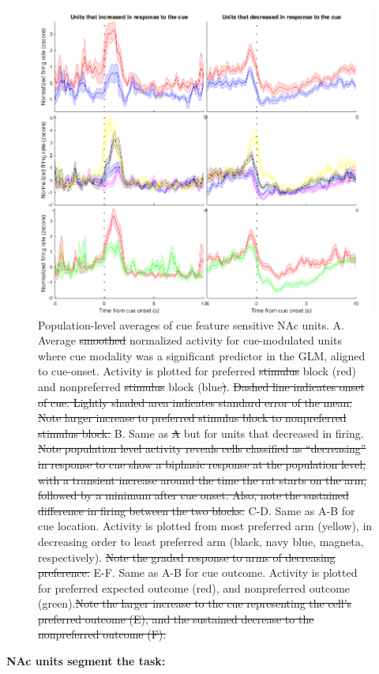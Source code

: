 \documentclass[11pt]{article}
\providecommand{\DIFdel}[1]{{\protect\color{red}\sout{#1}}}                      %
\providecommand{\DIFdelFL}[1]{\DIFdel{#1}} %
\providecommand{\DIFdelbeginFL}{} %
\providecommand{\DIFdelendFL}{} %
\newcommand{\DIFscaledelfig}{0.5}
\newlength{\DIFdelgraphicswidth} %
\newlength{\DIFdelgraphicsheight} %
\newcommand{\DIFdelincludegraphics}[2][]{%
\sbox{\DIFdelgraphicsbox}{\DIFOincludegraphics[#1]{#2}}%
\settoboxwidth{\DIFdelgraphicswidth}{\DIFdelgraphicsbox} %
\settoboxtotalheight{\DIFdelgraphicsheight}{\DIFdelgraphicsbox} %
\scalebox{\DIFscaledelfig}{%
\parbox[b]{\DIFdelgraphicswidth}{\usebox{\DIFdelgraphicsbox}\\[-\baselineskip] \rule{\DIFdelgraphicswidth}{0em}}\llap{\resizebox{\DIFdelgraphicswidth}{\DIFdelgraphicsheight}{%
\setlength{\unitlength}{\DIFdelgraphicswidth}%
\begin{picture}(1,1)%
\thicklines\linethickness{2pt} %
{\color[rgb]{1,0,0}\put(0,0){\framebox(1,1){}}}%
{\color[rgb]{1,0,0}\put(0,0){\line( 1,1){1}}}%
{\color[rgb]{1,0,0}\put(0,1){\line(1,-1){1}}}%
\end{picture}%
}\hspace*{3pt}}} %
} %
\DeclareRobustCommand{\DIFdelbeginFL}{\DIFOdelbeginFL \let\includegraphics\DIFdelincludegraphics} %
\DeclareRobustCommand{\DIFdelendFL}{\DIFOaddendFL \let\includegraphics\DIFOincludegraphics} %
\begin{document}
\begin{figure}[h]
\centering
\includegraphics[width=\textwidth]{Fig 7 - Population averages.png}
\caption{Population-level averages of cue feature sensitive NAc units. A. Average \DIFdelbeginFL \DIFdelFL{smoothed }\DIFdelendFL normalized activity for cue-modulated units where cue modality was a significant predictor in the GLM, aligned to cue-onset. Activity is plotted for preferred \DIFdelbeginFL \DIFdelFL{stimulus }\DIFdelendFL block (red) and nonpreferred \DIFdelbeginFL \DIFdelFL{stimulus }\DIFdelendFL block (blue\DIFdelbeginFL \DIFdelFL{)}\DIFdelendFL . \DIFdelbeginFL \DIFdelFL{Dashed line indicates onset of cue. Lightly shaded area indicates standard error of the mean. Note larger increase to preferred stimulus block to nonpreferred stimulus block. }\DIFdelendFL B. Same as \DIFdelbeginFL \DIFdelFL{A }\DIFdelendFL but for units that decreased in firing. \DIFdelbeginFL \DIFdelFL{Note population level activity reveals cells classified as “decreasing” in response to cue show a biphasic response at the population level, with a transient increase around the time the rat starts on the arm, followed by a minimum after cue onset. Also, note the sustained difference in firing between the two blocks. }\DIFdelendFL C-D. Same as A-B for cue location. Activity is plotted from most preferred arm (yellow), in decreasing order to least preferred arm (black, navy blue, magneta, respectively). \DIFdelbeginFL \DIFdelFL{Note the graded response to arms of decreasing preference. }\DIFdelendFL E-F. Same as A-B for cue outcome. Activity is plotted for preferred expected outcome (red), and nonpreferred outcome (green).\DIFdelbeginFL \DIFdelFL{Note the larger increase to the cue representing the cell’s preferred outcome (E), and the sustained decrease to the nonpreferred outcome (F).}\DIFdelendFL }
\label{fig:pop}
\end{figure}
{\bf NAc units segment the task:}
\end{document}
